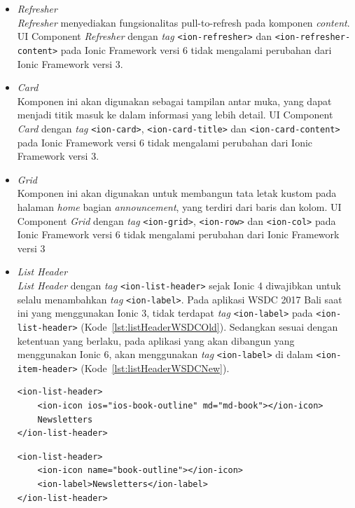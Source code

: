 \begin{enumerate}
\begin{enumerate}
\begin{itemize}
			\item \textit{Refresher} \\
		\textit{Refresher} menyediakan fungsionalitas  pull-to-refresh pada komponen \textit{content}. UI Component \textit{Refresher} dengan \textit{tag} \texttt{<ion-refresher>} dan \texttt{<ion-refresher-content>} pada Ionic Framework versi 6 tidak mengalami perubahan dari Ionic Framework versi 3.	
		
			\item \textit{Card} \\
			Komponen ini akan digunakan sebagai tampilan antar muka, yang dapat menjadi titik masuk ke dalam informasi yang lebih detail. UI Component \textit{Card} dengan \textit{tag} \texttt{<ion-card>}, \texttt{<ion-card-title>} dan \texttt{<ion-card-content>} pada Ionic Framework versi 6 tidak mengalami perubahan dari Ionic Framework versi 3.
			
			\item \textit{Grid} \\
			Komponen ini akan digunakan untuk membangun tata letak kustom pada halaman \textit{home} bagian \textit{announcement}, yang terdiri dari baris dan kolom. UI Component \textit{Grid} dengan \textit{tag} \texttt{<ion-grid>}, \texttt{<ion-row>} dan \texttt{<ion-col>} pada Ionic Framework versi 6 tidak mengalami perubahan dari Ionic Framework versi 3
			
			\item \textit{List Header} \\
			\textit{List Header} dengan \textit{tag} \texttt{<ion-list-header>} sejak Ionic 4 diwajibkan untuk selalu menambahkan \textit{tag} \texttt{<ion-label>}. Pada aplikasi WSDC 2017 Bali saat ini yang menggunakan Ionic 3, tidak terdapat \textit{tag} \texttt{<ion-label>} pada \texttt{<ion-list-header>} (Kode~\ref{lst:listHeaderWSDCOld}). Sedangkan sesuai dengan ketentuan yang berlaku, pada aplikasi yang akan dibangun yang menggunakan Ionic 6, akan menggunakan \textit{tag} \texttt{<ion-label>} di dalam \texttt{<ion-item-header>} (Kode~\ref{lst:listHeaderWSDCNew}).
			
\begin{lstlisting}[label={lst:listHeaderWSDCOld}, caption=\textit{Tag} <ion-list-header> dengan Ionic 3 di Aplikasi WSDC 2017 Bali Saat Ini]
<ion-list-header>
	<ion-icon ios="ios-book-outline" md="md-book"></ion-icon>
    Newsletters
</ion-list-header>
\end{lstlisting}
\newpage
\begin{lstlisting}[label={lst:listHeaderWSDCNew}, caption=\textit{Tag} <ion-list-header> dengan Ionic 6 di Aplikasi WSDC 2017 Bali yang Akan dibuat]
<ion-list-header>
	<ion-icon name="book-outline"></ion-icon>
    <ion-label>Newsletters</ion-label>
</ion-list-header>
\end{lstlisting}
			

\end{itemize}
\end{enumerate}
\end{enumerate}
